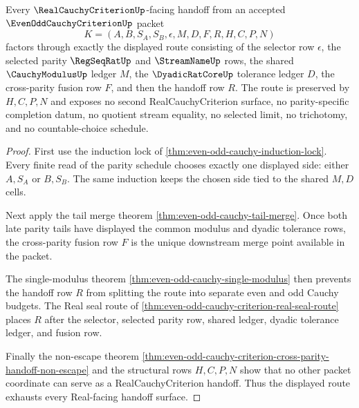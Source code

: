 \begin{theorem}
\label{thm:even-odd-cauchy-real-handoff-exhaustion}
Every $\RealCauchyCriterionUp$-facing handoff from an accepted $\EvenOddCauchyCriterionUp$ packet
$$
K=(A,B,S_A,S_B,\epsilon,M,D,F,R,H,C,P,N)
$$
factors through exactly the displayed route consisting of the selector row $\epsilon$, the selected parity $\RegSeqRatUp$ and $\StreamNameUp$ rows, the shared $\CauchyModulusUp$ ledger $M$, the $\DyadicRatCoreUp$ tolerance ledger $D$, the cross-parity fusion row $F$, and then the handoff row $R$. The route is preserved by $H,C,P,N$ and exposes no second RealCauchyCriterion surface, no parity-specific completion datum, no quotient stream equality, no selected limit, no trichotomy, and no countable-choice schedule.
\end{theorem}
\begin{proof}
First use the induction lock of \autoref{thm:even-odd-cauchy-induction-lock}. Every finite read of the parity schedule chooses exactly one displayed side: either $A,S_A$ or $B,S_B$. The same induction keeps the chosen side tied to the shared $M,D$ cells.

Next apply the tail merge theorem \autoref{thm:even-odd-cauchy-tail-merge}. Once both late parity tails have displayed the common modulus and dyadic tolerance rows, the cross-parity fusion row $F$ is the unique downstream merge point available in the packet.

The single-modulus theorem \autoref{thm:even-odd-cauchy-single-modulus} then prevents the handoff row $R$ from splitting the route into separate even and odd Cauchy budgets. The Real seal route of \autoref{thm:even-odd-cauchy-criterion-real-seal-route} places $R$ after the selector, selected parity row, shared ledger, dyadic tolerance ledger, and fusion row.

Finally the non-escape theorem \autoref{thm:even-odd-cauchy-criterion-cross-parity-handoff-non-escape} and the structural rows $H,C,P,N$ show that no other packet coordinate can serve as a RealCauchyCriterion handoff. Thus the displayed route exhausts every Real-facing handoff surface.
\end{proof}


